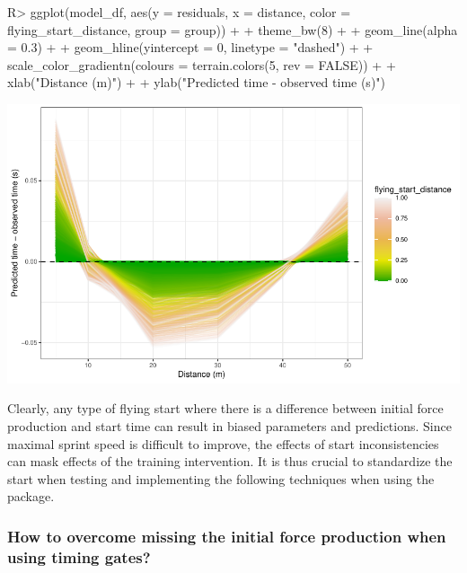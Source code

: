 \documentclass[
]{jss}
\begin{document}
\begin{CodeChunk}
\begin{CodeInput}
R> ggplot(model_df, aes(y = residuals, x = distance, color = flying_start_distance, group = group)) +
+   theme_bw(8) +
+   geom_line(alpha = 0.3) +
+   geom_hline(yintercept = 0, linetype = "dashed") +
+   scale_color_gradientn(colours = terrain.colors(5, rev = FALSE)) +
+   xlab("Distance (m)") +
+   ylab("Predicted time - observed time (s)")
\end{CodeInput}


\begin{center}\includegraphics[width=1\linewidth]{paper_files/figure-latex/unnamed-chunk-31-1} \end{center}

\end{CodeChunk}

Clearly, any type of flying start where there is a difference between initial force production and start time can result in biased parameters and predictions. Since maximal sprint speed is difficult to improve, the effects of start inconsistencies can mask effects of the training intervention. It is thus crucial to standardize the start when testing and implementing the following techniques when using the  package.

\hypertarget{how-to-overcome-missing-the-initial-force-production-when-using-timing-gates}{%
\subsubsection{How to overcome missing the initial force production when using timing gates?}\label{how-to-overcome-missing-the-initial-force-production-when-using-timing-gates}}
\end{document}

